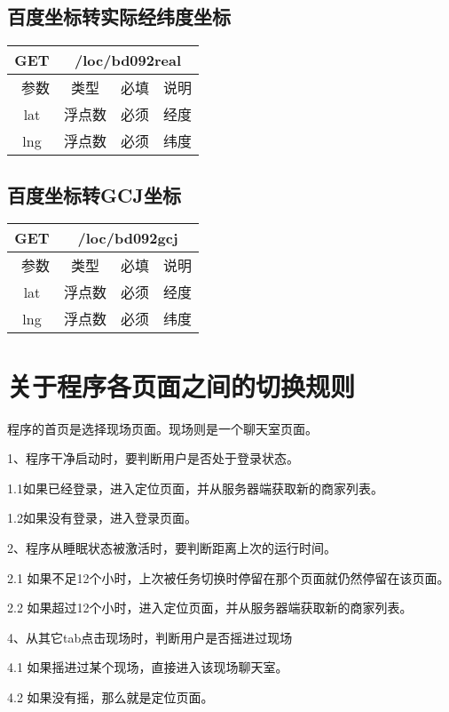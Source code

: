 \documentclass[cs4size]{ctexartutf8}
\begin{document}
\subsection{百度坐标转实际经纬度坐标}

\begin{table}[H]
   \begin{center}
\begin{tabular}{|c|c|c|p{12cm}|}
\hline
GET & \multicolumn{3}{|c|}{/loc/bd092real} \\
\hline\hline
 \  参数  & 类型 & 必填 &  说明  \\
\hline
 lat  & 浮点数 & 必须 & 经度\\
\hline
 lng  &  浮点数 & 必须 & 纬度\\ 
\hline
\end{tabular}
   \end{center}
\end{table}



\subsection{百度坐标转GCJ坐标}

\begin{table}[H]
   \begin{center}
\begin{tabular}{|c|c|c|p{12cm}|}
\hline
GET & \multicolumn{3}{|c|}{/loc/bd092gcj} \\
\hline\hline
 \  参数  & 类型 & 必填 &  说明  \\
\hline
 lat  & 浮点数 & 必须 & 经度\\
\hline
 lng  &  浮点数 & 必须 & 纬度\\ 
\hline
\end{tabular}
   \end{center}
\end{table}



\section{关于程序各页面之间的切换规则}

程序的首页是选择现场页面。现场则是一个聊天室页面。

1、程序干净启动时，要判断用户是否处于登录状态。

1.1如果已经登录，进入定位页面，并从服务器端获取新的商家列表。

1.2如果没有登录，进入登录页面。


2、程序从睡眠状态被激活时，要判断距离上次的运行时间。

2.1 如果不足12个小时，上次被任务切换时停留在那个页面就仍然停留在该页面。

2.2 如果超过12个小时，进入定位页面，并从服务器端获取新的商家列表。



4、从其它tab点击现场时，判断用户是否摇进过现场

4.1 如果摇进过某个现场，直接进入该现场聊天室。

4.2 如果没有摇，那么就是定位页面。




\newpage
\end{document}
